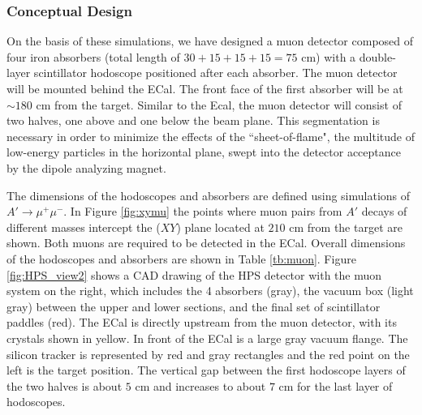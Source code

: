 \subsubsection{Conceptual Design}

On the basis of these simulations, we have designed a muon detector composed of four iron absorbers (total length of $30+15+15+15=75$ cm) 
with a double-layer scintillator hodoscope positioned after each absorber. The muon detector will be mounted behind the ECal.  The front face 
of the first absorber will be at $\sim 180$ cm from the target. Similar to the Ecal, the muon detector will consist of two halves, one above 
and one below the beam plane.  This segmentation is necessary in order to
minimize the effects of the ``sheet-of-flame", the multitude of low-energy particles in the horizontal plane, swept into the detector 
acceptance by the dipole analyzing magnet.

The dimensions of the hodoscopes and absorbers are defined using simulations of $A'\to \mu^+\mu^-$. In 
Figure \ref{fig:xymu} the points where muon pairs from $A'$ decays of different masses intercept the ($XY$) plane located at $210$ cm from the 
target are shown. Both muons are required to be detected in the ECal. Overall dimensions of the hodoscopes and absorbers are shown in 
Table \ref{tb:muon}.  
Figure \ref{fig:HPS_view2} shows a CAD
drawing of the HPS detector with the muon system on the right, which includes the 4 absorbers (gray), the vacuum box (light gray) 
between the upper and lower sections, and the final set of scintillator paddles (red). The ECal is directly upstream from the muon detector, 
with its crystals shown in yellow.  In front of the ECal is a large gray vacuum flange.  The silicon tracker is represented by red and gray 
rectangles and  the red point on the left is the target position. The vertical gap between the first hodoscope layers of the two halves is 
about $5$ cm and increases to about $7$ cm for the last layer of hodoscopes. 

